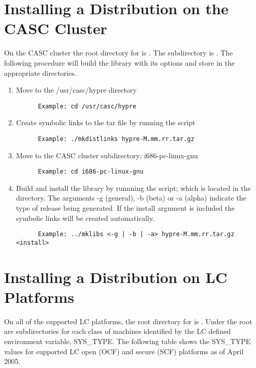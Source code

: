\section{Installing a Distribution on the CASC Cluster}
\label{Installing a Distribution on the CASC Cluster}

On the CASC cluster the root directory for \hypre{} is .  The 
subdirectory is . The following procedure will build the 
library with its options and store in the appropriate directories.

\begin{enumerate}
\item Move to the /usr/casc/hypre directory
\begin{verbatim}
      Example: cd /usr/casc/hypre
\end{verbatim}
\item Create symbolic links to the tar file by running the  script
\begin{verbatim}
      Example: ./mkdistlinks hypre-M.mm.rr.tar.gz
\end{verbatim}
\item Move to the CASC cluster subdirectory; i686-pc-linux-gnu
\begin{verbatim}
      Example: cd i686-pc-linux-gnu
\end{verbatim}
\item Build and install the library by runnning the  script; which is
         located in the  directory.
      The arguments -g (general), -b (beta) or -a (alpha) indicate the type of 
          release being generated.  If the install argument is included the 
          symbolic links will be created automatically.
\begin{verbatim}
      Example: ../mklibs <-g | -b | -a> hypre-M.mm.rr.tar.gz <install>
\end{verbatim}
\end{enumerate}

\section{Installing a Distribution on LC Platforms}
\label{Installing a Distribution on LC Platforms}

On all of the supported LC platforms, the root directory for \hypre{} is 
.  Under the root are subdirectories for each class 
of machines identified by the LC defined environment variable, SYS\_TYPE.
The following table shows the SYS\_TYPE values for supported LC open (OCF) 
and secure (SCF) platforms as of April 2005.

